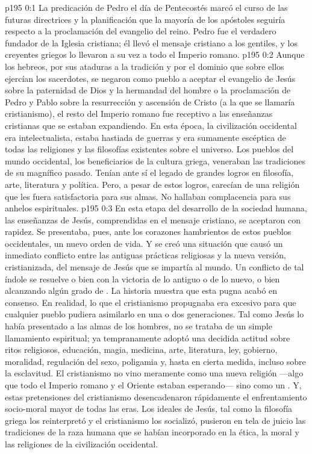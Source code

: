 \author{Comisión de seres intermedios}
\vs p195 0:1 La predicación de Pedro el día de Pentecostés marcó el curso de las futuras directrices y la planificación que la mayoría de los apóstoles seguiría respecto a la proclamación del evangelio del reino. Pedro fue el verdadero fundador de la Iglesia cristiana; él llevó el mensaje cristiano a los gentiles, y los creyentes griegos lo llevaron a su vez a todo el Imperio romano.
\vs p195 0:2 Aunque los hebreos, por sus ataduras a la tradición y por el dominio que sobre ellos ejercían los sacerdotes, se negaron como pueblo a aceptar el evangelio de Jesús sobre la paternidad de Dios y la hermandad del hombre o la proclamación de Pedro y Pablo sobre la resurrección y ascensión de Cristo (a la que se llamaría cristianismo), el resto del Imperio romano fue receptivo a las enseñanzas cristianas que se estaban expandiendo. En esta época, la civilización occidental era intelectualista, estaba hastiada de guerras y era sumamente escéptica de todas las religiones y las filosofías existentes sobre el universo. Los pueblos del mundo occidental, los beneficiarios de la cultura griega, veneraban las tradiciones de su magnífico pasado. Tenían ante sí el legado de grandes logros en filosofía, arte, literatura y política. Pero, a pesar de estos logros, carecían de una religión que les fuera satisfactoria para sus almas. No hallaban complacencia para sus anhelos espirituales.
\vs p195 0:3 En esta etapa del desarrollo de la sociedad humana, las enseñanzas de Jesús, comprendidas en el mensaje cristiano, se aceptaron con rapidez. Se presentaba, pues, ante los corazones hambrientos de estos pueblos occidentales, un nuevo orden de vida. Y se creó una situación que causó un inmediato conflicto entre las antiguas prácticas religiosas y la nueva versión, cristianizada, del mensaje de Jesús que se impartía al mundo. Un conflicto de tal índole se resuelve o bien con la victoria de lo antiguo o de lo nuevo, o bien alcanzando algún grado de . La historia muestra que esta pugna acabó en consenso. En realidad, lo que el cristianismo propugnaba era excesivo para que cualquier pueblo pudiera asimilarlo en una o dos generaciones. Tal como Jesús lo había presentado a las almas de los hombres, no se trataba de un simple llamamiento espiritual; ya tempranamente adoptó una decidida actitud sobre ritos religiosos, educación, magia, medicina, arte, literatura, ley, gobierno, moralidad, regulación del sexo, poligamia y, hasta en cierta medida, incluso sobre la esclavitud. El cristianismo no vino meramente como una nueva religión ---algo que todo el Imperio romano y el Oriente estaban esperando--- sino como un . Y, estas pretensiones del cristianismo desencadenaron rápidamente el enfrentamiento socio\hyp{}moral mayor de todas las eras. Los ideales de Jesús, tal como la filosofía griega los reinterpretó y el cristianismo los socializó, pusieron en tela de juicio las tradiciones de la raza humana que se habían incorporado en la ética, la moral y las religiones de la civilización occidental.
